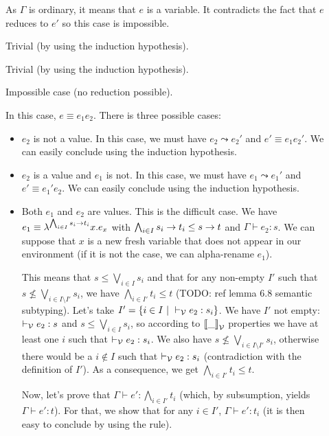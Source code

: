 \documentclass[a4paper]{article}
\theoremstyle{definition}
\begin{document}
        \begin{description}
          \item[] As $\Gamma$ is ordinary, it means that $e$ is a variable.
          It contradicts the fact that $e$ reduces to $e'$ so this case is impossible. 
          \item[] Trivial (by using the induction hypothesis).
          \item[] Trivial (by using the induction hypothesis).
          \item[] Impossible case (no reduction possible).
          \item[] In this case, $e\equiv e_1 e_2$.
          There is three possible cases:
          \begin{itemize}
            \item $e_2$ is not a value. In this case, we must have $e_2\leadsto e_2'$
            and $e'\equiv e_1 e_2'$. We can easily conclude using the induction hypothesis.
            \item $e_2$ is a value and $e_1$ is not. In this case, we must have $e_1\leadsto e_1'$
            and $e'\equiv e_1' e_2$. We can easily conclude using the induction hypothesis.
            \item Both $e_1$ and $e_2$ are values. This is the difficult case.
            We have $e_1\equiv \lambda^{\bigwedge_{i\in I}s_i\to t_i}x.e_x$
            with $\bigwedge_{i\in I}s_i\to t_i \leq s\to t$ and $\Gamma \vdash e_2:s$.
            We can suppose that $x$ is a new fresh variable that does not appear in our environment
            (if it is not the case, we can alpha-rename $e_1$).

            This means that $s\leq \bigvee_{i\in I} s_i$ and that for any non-empty $I'$ such that
            $s\not\leq \bigvee_{i\in I\setminus I'} s_i$, we have $\bigwedge_{i\in I'} t_i \leq t$
            (TODO: ref lemma 6.8 semantic subtyping). Let's take $I'=\{i\in I~|~ \vdash_{\mathcal{V}} e_2:s_i\}$.
            We have $I'$ not empty: $\vdash_{\mathcal{V}} e_2:s$ and $s\leq \bigvee_{i\in I} s_i$, so according to
            ${\llbracket \_ \rrbracket}_{\mathcal{V}}$ properties we have at least one $i$ such that $\vdash_{\mathcal{V}} e_2:s_i$.
            We also have $s\not\leq \bigvee_{i\in I\setminus I'} s_i$, otherwise there would be a $i\not\in I$
            such that $\vdash_{\mathcal{V}} e_2: s_i$ (contradiction with the definition of $I'$).
            As a consequence, we get $\bigwedge_{i\in I'} t_i \leq t$.

            Now, let's prove that $\Gamma \vdash e':\bigwedge_{i\in I'} t_i$ (which, by subsumption,
            yields $\Gamma \vdash e': t$). For that, we show that for any $i\in I'$, $\Gamma \vdash e':t_i$
            (it is then easy to conclude by using the  rule).


\end{itemize}
\end{description}
\end{document}
